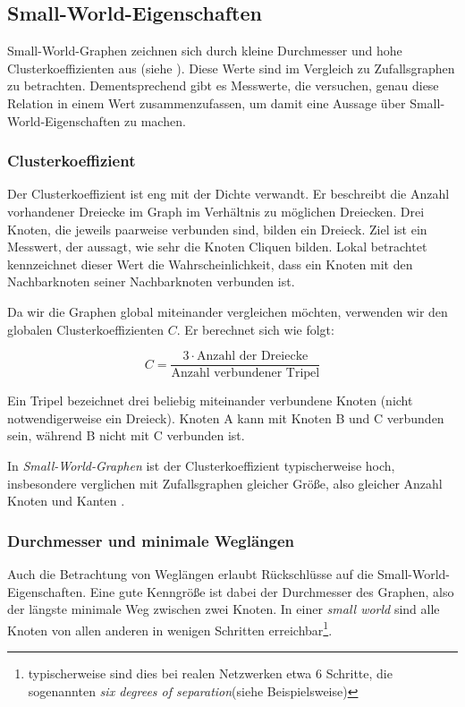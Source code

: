 \documentclass[11pt, a4paper]{article}
\begin{document}
\subsection{Small-World-Eigenschaften}

Small-World-Graphen zeichnen sich durch kleine Durchmesser und hohe Clusterkoeffizienten aus (siehe \cite{Telesford2011}).
Diese Werte sind im Vergleich zu Zufallsgraphen zu betrachten.
Dementsprechend gibt es Messwerte, die versuchen, genau diese Relation in einem Wert zusammenzufassen, um damit eine Aussage über Small-World-Eigenschaften zu machen. 


\subsubsection{Clusterkoeffizient}

Der Clusterkoeffizient ist eng mit der Dichte verwandt. Er beschreibt die
Anzahl vorhandener Dreiecke im Graph im Verhältnis zu möglichen Dreiecken. Drei
Knoten, die jeweils paarweise verbunden sind, bilden ein Dreieck. Ziel ist ein
Messwert, der aussagt, wie sehr die Knoten Cliquen bilden. Lokal betrachtet
kennzeichnet dieser Wert die Wahrscheinlichkeit, dass ein Knoten mit den
Nachbarknoten seiner Nachbarknoten verbunden ist.

Da wir die Graphen global miteinander vergleichen möchten, verwenden wir den
globalen Clusterkoeffizienten $C$. Er berechnet sich wie folgt:

$$
    C = \frac{3\cdot\text{Anzahl der Dreiecke}}{\text{Anzahl verbundener Tripel}}
$$

Ein Tripel bezeichnet drei beliebig miteinander verbundene Knoten (nicht
notwendigerweise ein Dreieck). Knoten A kann mit Knoten B und C verbunden sein,
während B nicht mit C verbunden ist.

In \emph{Small-World-Graphen} ist der Clusterkoeffizient typischerweise hoch, 
insbesondere verglichen mit Zufallsgraphen gleicher Größe, also gleicher Anzahl
Knoten und Kanten \cite{Newman2003}.


\subsubsection{Durchmesser und minimale Wegl\"angen}

Auch die Betrachtung von Weglängen erlaubt Rückschlüsse auf die Small-World-Eigenschaften.
Eine gute Kenngröße ist dabei der Durchmesser
des Graphen, also der längste minimale Weg zwischen zwei Knoten. In einer
\emph{small world} sind alle Knoten von allen anderen in wenigen Schritten
erreichbar\footnote{typischerweise sind dies bei realen Netzwerken etwa 6 Schritte, die sogenannten 
\emph{six degrees of separation}(siehe Beispielsweise\cite{Newman2003})}.
\end{document}
